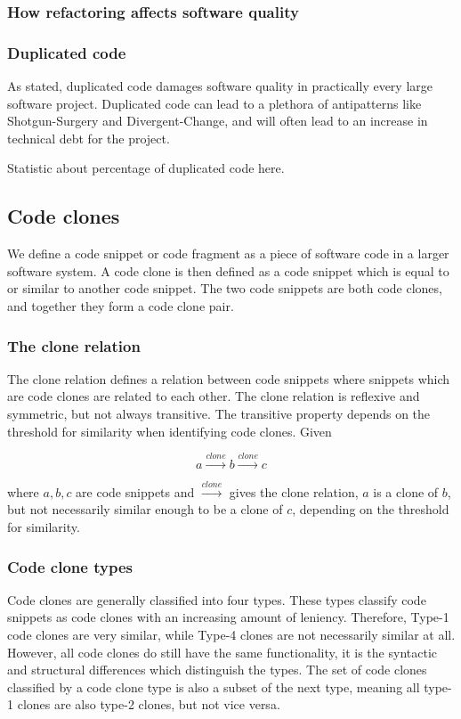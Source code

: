 \documentclass[12pt]{article}
\begin{document}
\subsubsection{How refactoring affects software quality}

\subsubsection{Duplicated code}

As stated, duplicated code damages software quality in practically every large software
project. Duplicated code can lead to a plethora of antipatterns like Shotgun-Surgery and
Divergent-Change, and will often lead to an increase in technical debt for the
project\cite[99]{fowlerrefactoring}.

Statistic about percentage of duplicated code here.

\subsection{Code clones}

We define a code snippet or code fragment as a piece of software code in a larger software
system. A code clone is then defined as a code snippet which is equal to or similar to
another code snippet. The two code snippets are both code clones, and together they form a
code clone pair.

\subsubsection{The clone relation}
The clone relation defines a relation between code snippets where snippets which are
code clones are related to each other. The clone relation is reflexive and symmetric, but
not always transitive. The transitive property depends on the threshold for similarity when
identifying code clones. Given

$$a \xrightarrow{clone} b \xrightarrow{clone} c$$

where $a,b,c$ are code snippets and $\xrightarrow{clone}$ gives the clone relation, $a$ is
a clone of $b$, but not necessarily similar enough to be a clone of $c$, depending on the
threshold for similarity.

\subsubsection{Code clone types}

Code clones are generally classified into four types\cite{Inoue_introduction_to_cc}. These
types classify code snippets as code clones with an increasing amount of leniency.
Therefore, Type-1 code clones are very similar, while Type-4 clones are not necessarily
similar at all. However, all code clones do still have the same functionality, it is the
syntactic and structural differences which distinguish the types. The set of code clones
classified by a code clone type is also a subset of the next type, meaning all type-1
clones are also type-2 clones, but not vice versa.
\end{document}
